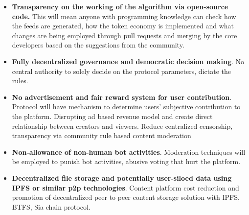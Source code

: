 \documentclass[a4paper]{article}
\begin{document}
\begin{itemize}
    \item \textbf{Transparency on the working of the algorithm via open-source code.} This will mean anyone with programming knowledge can check how the feeds are generated, how the token economy is implemented and what changes are being employed through pull requests and merging by the core developers based on the suggestions from the community.
    \item \textbf{Fully decentralized governance and democratic decision making}. No central authority to solely decide on the protocol parameters, dictate the rules.
    \item \textbf{No advertisement and fair reward system for user contribution}. Protocol will have mechanism to determine users' subjective contribution to the platform. Disrupting ad based revenue model and create direct relationship between creators and viewers.  Reduce centralized censorship, transparency via community rule based content moderation
    \item \textbf{Non-allowance of non-human bot activities}. Moderation techniques will be employed to punish bot activities, abusive voting that hurt the platform.
    \item \textbf{Decentralized file storage and potentially user-siloed data using IPFS or similar p2p technologies}. Content platform cost reduction and promotion of decentralized peer to peer content storage solution with IPFS, BTFS, Sia chain protocol.
\end{itemize}
\end{document}
